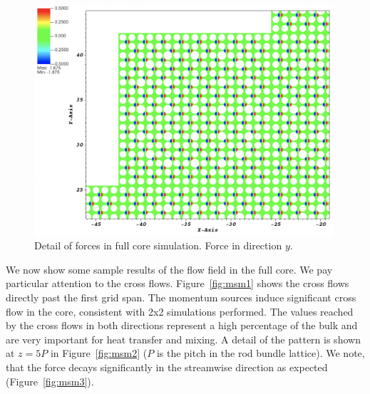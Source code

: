 \begin{figure}[!ht]
\centering
\includegraphics[width=0.99\textwidth]{./figures/1span_msm.png}
\caption{Detail of forces in full core simulation. Force in direction $y$. }
\label{fig:msm}
\end{figure}

We now show some sample results of the flow field in the full core. We pay particular attention to the cross flows. Figure~\ref{fig:msm1} shows the cross flows directly past the first grid span. The momentum sources induce significant cross flow in the core, consistent with 2x2 simulations performed. The values reached by the cross flows in both directions represent a high percentage of the bulk and are very important for heat transfer and mixing. A detail of the pattern is shown at $z=5P$ in Figure~\ref{fig:msm2} ($P$ is the pitch in the rod bundle lattice). We note, that the force decays significantly in the streamwise direction as expected (Figure~\ref{fig:msm3}).

